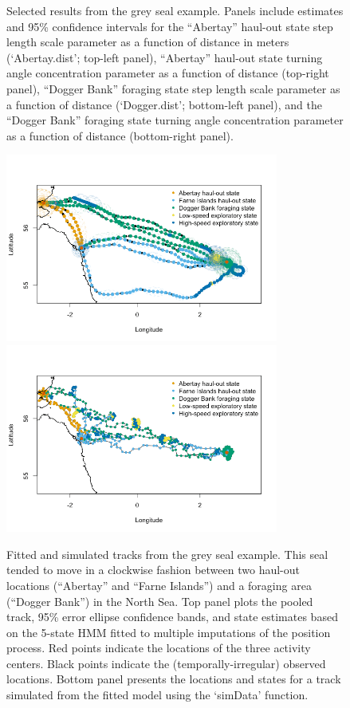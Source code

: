 \documentclass[12pt]{article}\usepackage[]{graphicx}\usepackage[]{xcolor}
\begin{document}
\begin{figure}[htbp]
  \caption{Selected results from the grey seal example. Panels include estimates and 95\% confidence intervals for the ``Abertay'' haul-out state step length scale parameter as a function of distance in meters (`Abertay.dist'; top-left panel), ``Abertay'' haul-out state turning angle concentration parameter as a function of distance (top-right panel), ``Dogger Bank'' foraging state step length scale parameter as a function of distance (`Dogger.dist'; bottom-left panel), and the ``Dogger Bank'' foraging state turning angle concentration parameter as a function of distance (bottom-right panel).}
  \label{fig:greySealResults}
\end{figure}

\begin{figure}[htbp]
  \centering
    \includegraphics[width=0.8\textwidth]{plot_greySealResults1.png}\\
    \includegraphics[width=0.8\textwidth]{plot_greySealResults2.png}
  \caption{Fitted and simulated tracks from the grey seal example. This seal tended to move in a clockwise fashion between two haul-out locations (``Abertay'' and ``Farne Islands'') and a foraging area (``Dogger Bank'') in the North Sea. Top panel plots the pooled track, 95\% error ellipse confidence bands, and state estimates based on the 5-state HMM fitted to multiple imputations of the position process. Red points indicate the locations of the three activity centers. Black points indicate the (temporally-irregular) observed locations. Bottom panel presents the locations and states for a track simulated from the fitted model using the `simData' function.}
  \label{fig:greySealStateSims}
\end{figure}
\end{document}
